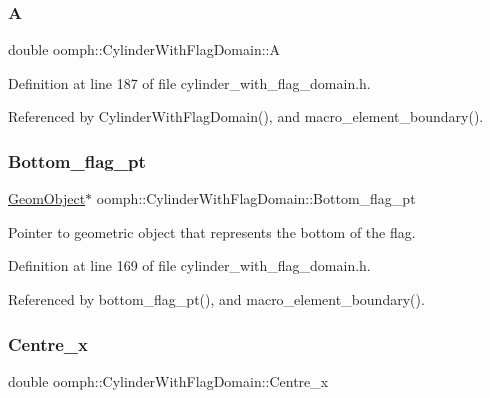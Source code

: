 \subsubsection{\texorpdfstring{A}{A}}
{\footnotesize\ttfamily double oomph\+::\+Cylinder\+With\+Flag\+Domain\+::A\hspace{0.3cm}{\ttfamily [private]}}



Definition at line 187 of file cylinder\+\_\+with\+\_\+flag\+\_\+domain.\+h.



Referenced by Cylinder\+With\+Flag\+Domain(), and macro\+\_\+element\+\_\+boundary().

\mbox{\label{classoomph_1_1CylinderWithFlagDomain_ae4bfb961e03aab16d01fc4662c0214e3}} 
\subsubsection{\texorpdfstring{Bottom\+\_\+flag\+\_\+pt}{Bottom\_flag\_pt}}
{\footnotesize\ttfamily \hyperlink{classoomph_1_1GeomObject}{Geom\+Object}$\ast$ oomph\+::\+Cylinder\+With\+Flag\+Domain\+::\+Bottom\+\_\+flag\+\_\+pt\hspace{0.3cm}{\ttfamily [private]}}



Pointer to geometric object that represents the bottom of the flag. 



Definition at line 169 of file cylinder\+\_\+with\+\_\+flag\+\_\+domain.\+h.



Referenced by bottom\+\_\+flag\+\_\+pt(), and macro\+\_\+element\+\_\+boundary().

\mbox{\label{classoomph_1_1CylinderWithFlagDomain_a9473fc0eb249a20c8a3456c708c8ba6f}} 
\subsubsection{\texorpdfstring{Centre\+\_\+x}{Centre\_x}}
{\footnotesize\ttfamily double oomph\+::\+Cylinder\+With\+Flag\+Domain\+::\+Centre\+\_\+x\hspace{0.3cm}{\ttfamily [private]}}



